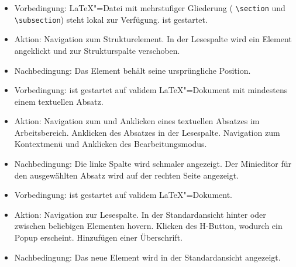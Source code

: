 \begin{itemize}
  \item Vorbedingung: \LaTeX"=Datei mit mehrstufiger Gliederung (\zB{} \verb|\section| und \verb|\subsection|) steht
  lokal zur Verfügung.
  \texla{} ist gestartet.
  \item Aktion: Navigation zum Strukturelement.
  In der Lesespalte wird ein Element angeklickt und zur Strukturspalte verschoben.
  \item Nachbedingung: Das Element behält seine ursprüngliche Position.
\end{itemize}

\begin{itemize}
  \item Vorbedingung: \texla{} ist gestartet auf validem \LaTeX"=Dokument mit mindestens einem textuellen Absatz.
  \item Aktion: Navigation zum und Anklicken eines textuellen Absatzes im Arbeitsbereich.
  Anklicken des Absatzes in der Lesespalte.
  Navigation zum Kontextmenü und Anklicken des Bearbeitungsmodus.
  \item Nachbedingung: Die linke Spalte wird schmaler angezeigt.
  Der Minieditor für den ausgewählten Absatz wird auf der rechten Seite angezeigt.
\end{itemize}

\clearpage

\begin{itemize}
  \item Vorbedingung: \texla{} ist gestartet auf validem \LaTeX"=Dokument.
  \item Aktion: Navigation zur Lesespalte.
  In der Standardansicht hinter oder zwischen beliebigen Elementen hovern.
  Klicken des H-Button, wodurch ein Popup erscheint.
  Hinzufügen einer Überschrift.
  \item Nachbedingung: Das neue Element wird in der Standardansicht angezeigt.
\end{itemize}

